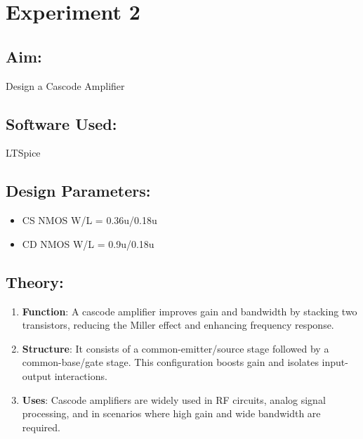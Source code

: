 \documentclass[a4paper,12pt]{report}
\begin{document}
  \newpage

\section{Experiment 2}

  \subsection{Aim:}
    \hspace{20pt}Design a Cascode Amplifier

  \vspace{0.3cm}

  \subsection{Software Used:}
    \hspace{20pt}LTSpice 

  \vspace{0.3cm}

  \subsection{Design Parameters:}
    \begin{itemize}
        \item CS NMOS W/L = 0.36u/0.18u
        \item CD NMOS W/L = 0.9u/0.18u
    \end{itemize}

  \vspace{0.3cm}

  \subsection{Theory:} 
    \begin{enumerate}
        \item \textbf{Function}: A cascode amplifier improves gain and bandwidth by stacking two transistors, reducing the Miller effect and enhancing frequency response.

        \item \textbf{Structure}: It consists of a common-emitter/source stage followed by a common-base/gate stage. This configuration boosts gain and isolates input-output interactions.

        \item \textbf{Uses}: Cascode amplifiers are widely used in RF circuits, analog signal processing, and in scenarios where high gain and wide bandwidth are required.
    \end{enumerate}
\end{document}
